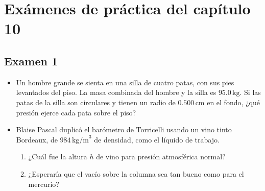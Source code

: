 \documentclass[11pt,a4paper]{article}
\begin{document}
\section*{Exámenes de práctica del capítulo 10}

\subsection*{Examen 1}

\begin{itemize}
    \item[\textbf{1.}] Un hombre grande se sienta en una silla de cuatro patas, con sus pies levantados del piso. La masa combinada del hombre y la silla es \(95.0\,\text{kg}\). Si las patas de la silla son circulares y tienen un radio de \(0.500\,\text{cm}\) en el fondo, ¿qué presión ejerce cada pata sobre el piso?
    \vspace*{6cm}
    
    \item[\textbf{2.}] Blaise Pascal duplicó el barómetro de Torricelli usando un vino tinto Bordeaux, de \(984\,\text{kg/m}^3\) de densidad, como el líquido de trabajo.
    \begin{enumerate}
        \item[\textbf{(a)}] ¿Cuál fue la altura \(h\) de vino para presión atmosférica normal?
        \item[\textbf{(b)}] ¿Esperaría que el vacío sobre la columna sea tan bueno como para el mercurio?
    \end{enumerate}
    
    \vspace*{7cm}
\end{itemize}

\newpage
\end{document}
